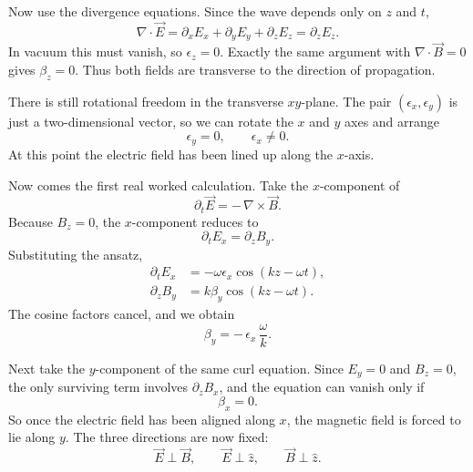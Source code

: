 Now use the divergence equations. Since the wave depends only on \(z\) and \(t\),
\begin{equation}
\nabla\cdot \vec E
=
\partial_x E_x+\partial_y E_y+\partial_z E_z
=
\partial_z E_z.
\end{equation}
In vacuum this must vanish, so \(\epsilon_z=0\). Exactly the same argument with \(\nabla\cdot \vec B=0\) gives \(\beta_z=0\). Thus both fields are transverse to the direction of propagation.

There is still rotational freedom in the transverse \(xy\)-plane. The pair \((\epsilon_x,\epsilon_y)\) is just a two-dimensional vector, so we can rotate the \(x\) and \(y\) axes and arrange
\begin{equation}
\epsilon_y=0,
\qquad
\epsilon_x\neq 0.
\end{equation}
At this point the electric field has been lined up along the \(x\)-axis.

Now comes the first real worked calculation. Take the \(x\)-component of
\begin{equation}
\partial_t \vec E=-\,\nabla\times \vec B.
\end{equation}
Because \(B_z=0\), the \(x\)-component reduces to
\begin{equation}
\partial_t E_x=\partial_z B_y.
\end{equation}
Substituting the ansatz,
\begin{align}
\partial_t E_x
&=
-\omega \epsilon_x \cos(kz-\omega t),
\\
\partial_z B_y
&=
k\beta_y \cos(kz-\omega t).
\end{align}
The cosine factors cancel, and we obtain
\begin{equation}
\beta_y=-\,\epsilon_x\,\frac{\omega}{k}.
\end{equation}

Next take the \(y\)-component of the same curl equation. Since \(E_y=0\) and \(B_z=0\), the only surviving term involves \(\partial_z B_x\), and the equation can vanish only if
\begin{equation}
\beta_x=0.
\end{equation}
So once the electric field has been aligned along \(x\), the magnetic field is forced to lie along \(y\). The three directions are now fixed:
\begin{equation}
\vec E \perp \vec B,
\qquad
\vec E \perp \hat z,
\qquad
\vec B \perp \hat z.
\end{equation}

